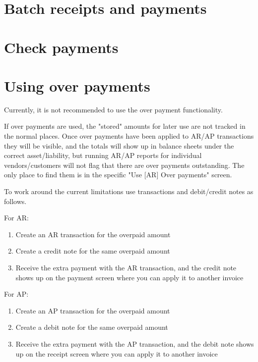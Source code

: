 \section{Batch receipts and payments}
\label{sec-business-processes-payment-processing-batch-payments}

\section{Check payments}
\label{sec-business-processes-payment-processing-check-payments}


\section{Using over payments}
\label{sec-business-processes-payment-processing-overpayments}

Currently, it is not recommended to use the over payment  functionality.

If over payments are used, the "stored" amounts for later use are not tracked in the normal places. Once over payments have been applied to AR/AP transactions they will be visible, and the totals will show up in balance sheets under the correct asset/liability, but running AR/AP reports for individual vendors/customers will not flag that there are over payments outstanding. The only place to find them is in the specific "Use [AR] Over payments" screen.

To work around the current limitations use transactions and debit/credit notes as follows.

For AR:
\begin{enumerate}
    \item Create an AR transaction for the overpaid amount
    \item Create a credit note for the same overpaid amount
    \item Receive the extra payment with the AR transaction, and the credit note shows up on the payment screen where you can apply it to another invoice
\end{enumerate}

For AP:
\begin{enumerate}
    \item Create an AP transaction for the overpaid amount
    \item Create a debit note for the same overpaid amount
    \item Receive the extra payment with the AP transaction, and the debit note shows up on the receipt screen where you can apply it to another invoice
\end{enumerate}


